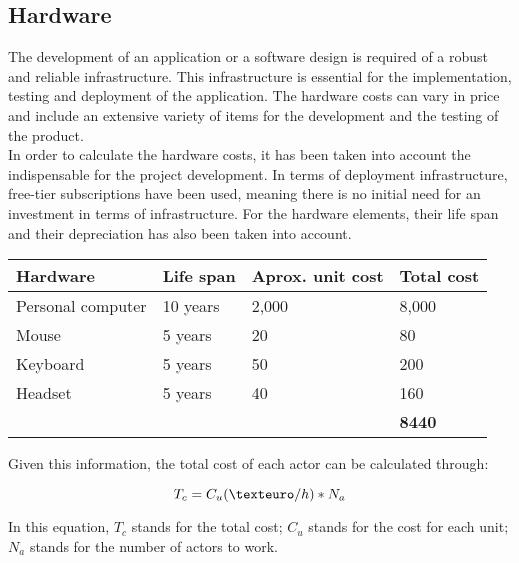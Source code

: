 \documentclass[../memory.tex]{subfiles}
\begin{document}
\subsection{Hardware}
The development of an application or a software design is required of a robust
and reliable infrastructure. This infrastructure is essential for the
implementation, testing and deployment of the application. The hardware costs
can vary in price and include an extensive variety of items for the development
and the testing of the product.
\\
In order to calculate the hardware costs, it has been taken into account the
indispensable for the project development. In terms of deployment
infrastructure, free-tier subscriptions have been used, meaning there is no
initial need for an investment in terms of infrastructure. For the hardware
elements, their life span and their depreciation has also been taken into
account.
\\[12pt]
\begin{tabularx}{\textwidth}{|X|X|X|X|}
	\hline
	\rowcolor{rowColor}
	Hardware              & Life span              & Aprox. unit cost & Total cost      \\
	\hline
	Personal computer     & 10 years               & 2,000 \texteuro  & 8,000 \texteuro \\
	\hline
	Mouse                 & 5 years                & 20\texteuro      & 80\texteuro     \\
	\hline
	Keyboard              & 5 years                & 50\texteuro      & 200\texteuro    \\
	\hline
	Headset               & 5 years                & 40\texteuro      & 160\texteuro    \\
	\hline
	\multicolumn{3}{X|}{} & \textbf{8440\texteuro}                                      \\
	\cline{4-3}
\end{tabularx}
\vspace*{8pt}
Given this information, the total cost of each actor can be calculated through:
\begin{center}
	\[ T_c = C_u(\texteuro/h) * N_a \]
\end{center}
In this equation, $T_c$ stands for the total cost; $C_u$ stands for the cost for
each unit; $N_a$ stands for the number of actors to work.
\end{document}
